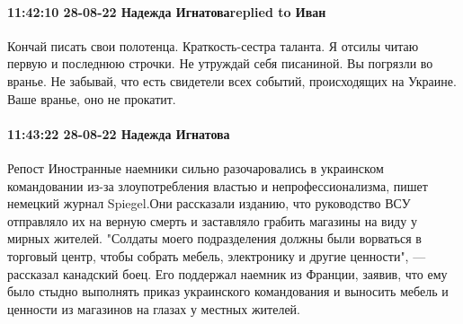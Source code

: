  
 
 
 
 

\paragraph{11:42:10 28-08-22 Надежда Игнатоваreplied to Иван}

Кончай писать свои полотенца. Краткость-сестра таланта. Я отсилы читаю первую и последнюю строчки. Не утруждай себя писаниной.
Вы погрязли во вранье. Не забывай, что есть свидетели всех событий, происходящих на Украине. Ваше вранье, оно не прокатит.

\paragraph{11:43:22 28-08-22 Надежда Игнатова}

Репост
Иностранные наемники сильно разочаровались в украинском командовании из-за злоупотребления властью и непрофессионализма, пишет немецкий журнал Spiegel.Они рассказали изданию, что руководство ВСУ отправляло их на верную смерть и заставляло грабить магазины на виду у мирных жителей. "Солдаты моего подразделения должны были ворваться в торговый центр, чтобы собрать мебель, электронику и другие ценности", — рассказал канадский боец. Его поддержал наемник из Франции, заявив, что ему было стыдно выполнять приказ украинского командования и выносить мебель и ценности из магазинов на глазах у местных жителей.
